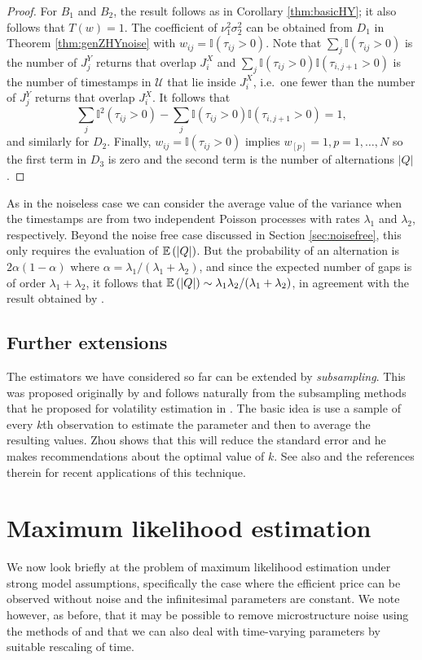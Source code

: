 \begin{proof}
For $B_1$ and $B_2$, the result follows as in Corollary \ref{thm:basicHY}; it also follows that $T(w) = 1$.  The coefficient of $\nu_1^2 \sigma_2^2$ can be obtained from $D_1$ in Theorem \ref{thm:genZHYnoise} with $w_{ij} = \mathbb{I}(\tau_{ij}>0)$. Note that $\sum_j \mathbb{I}(\tau_{ij}>0)$ is the number of $J_j^Y$ returns that overlap $J^X_i$ and  $\sum_j \mathbb{I}(\tau_{ij}>0)\mathbb{I}(\tau_{i,j+1}>0)$ is the number of timestamps in $\mathcal{U}$ that lie inside $J^X_i$, i.e.\ one fewer than the number of $J_j^Y$ returns that overlap $J^X_i$. It follows that 
$$\sum_j \mathbb{I}^2(\tau_{ij}>0) - \sum_j \mathbb{I}(\tau_{ij}>0) \mathbb{I}(\tau_{i,j+1}>0) = 1,$$ 
and similarly for   $D_2$. Finally, $w_{ij} = \mathbb{I}(\tau_{ij}>0)$ implies $w_{[p]} = 1, p=1,\dots,N$ so the first term in $D_3$ is zero and the second term is the number of alternations $|Q|$. 
\end{proof}
As in the noiseless case we can consider the average value of the variance when the timestamps are from two independent Poisson processes with rates $\lambda_1$ and $\lambda_2$, respectively. Beyond the noise free case discussed in Section \ref{sec:noisefree}, this only requires the evaluation of $\mathbb{E}\,(|Q|)$. But the probability of an alternation is $2\alpha (1-\alpha)$ where $\alpha = \lambda_1/(\lambda_1 + \lambda_2)$, and since the expected number of gaps is of order $\lambda_1 + \lambda_2$, it follows that $\mathbb{E}\,(|Q|) \sim \lambda_1 \lambda_2/(\lambda_1+\lambda_2)$, in agreement with the result obtained by \citet{griffin2011covariance}.

\subsection{Further extensions}
The estimators we have considered so far can be extended by \emph{subsampling}.  This was proposed originally by \citet{zhou1998estimating} and follows naturally from the subsampling methods that he proposed for volatility estimation in \citet{zhou1996high}.  The basic idea is use a sample of every $k$th observation to estimate the parameter and then to average the resulting values.  Zhou shows that this will reduce the standard error and he makes recommendations about the optimal value of $k$.  See also \citet{griffin2011covariance} and the references therein for recent applications of this technique.

\section{Maximum likelihood estimation}
We now look briefly at the problem of maximum likelihood estimation under strong model assumptions, specifically the case where the efficient price can be observed without noise and the infinitesimal parameters are constant. We note however, as before, that it may be possible to remove microstructure noise using the methods of \citet{robert2012volatility} and that we can also deal with time-varying parameters by suitable rescaling of time. 

